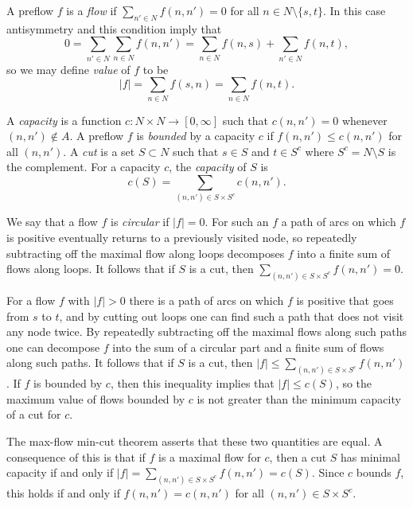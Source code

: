 \documentclass[12pt, A4paper]{article}
\theoremstyle{definition}
\begin{document}
A preflow $f$ is a \emph{flow} if $\sum_{n' \in N} f(n,n') = 0$ for all $n \in N \setminus \{s,t\}$.  In this case antisymmetry and this condition imply that
$$0 = \sum_{n' \in N}\sum_{n \in N} f(n,n') = \sum_{n \in N} f(n,s) + \sum_{n' \in N} f(n,t),$$
so we may define \emph{value} of $f$ to be
$$|f| = \sum_{n \in N} f(s,n) = \sum_{n \in N} f(n,t).$$

A \emph{capacity} is a function $c \colon N \times N \to [0,\infty]$ such that $c(n,n') = 0$ whenever $(n,n') \notin A$.   A preflow $f$ is \emph{bounded} by a capacity $c$ if $f(n,n') \le c(n,n')$ for all $(n,n')$.   A \emph{cut} is a set $S \subset N$ such that $s \in S$ and $t \in S^c$ where $S^c = N \setminus S$ is the complement.  For a capacity $c$, the \emph{capacity} of $S$ is
$$c(S) = \sum_{(n,n') \in S \times S^c} c(n,n').$$  

We say that a flow $f$ is \emph{circular} if $|f| = 0$.  For such an $f$ a path of arcs on which $f$ is positive eventually returns to a previously visited node, so repeatedly subtracting off the maximal flow along loops decomposes $f$ into a finite sum of flows along loops.  It follows that if $S$ is a cut, then $\sum_{(n,n') \in S \times S^c} f(n,n') = 0$.

For a flow $f$ with $|f| > 0$ there is a path of arcs on which $f$ is positive that goes from $s$ to $t$, and by cutting out loops one can find such a path  that does not visit any node twice.  By repeatedly subtracting off the maximal flows along such paths one can decompose $f$ into the sum of a circular part and a finite sum of flows along such paths.  It follows that if $S$ is a cut, then $|f| \le \sum_{(n,n') \in S \times S^c} f(n,n')$.  If $f$ is bounded by $c$, then this inequality implies that $|f| \le c(S)$, so the maximum value of flows bounded by $c$ is not greater than the minimum capacity of a cut for $c$.  

The max-flow min-cut theorem \citep{FoFu56} asserts that these two quantities are equal.  A consequence of this is that if $f$ is a maximal flow for $c$, then a cut $S$ has minimal capacity if and only if $|f| = \sum_{(n,n') \in S \times S^c} f(n,n') = c(S)$.  Since $c$ bounds $f$, this holds if and only if $f(n,n') = c(n,n')$ for all $(n,n') \in S \times S^c$. 
\end{document}
